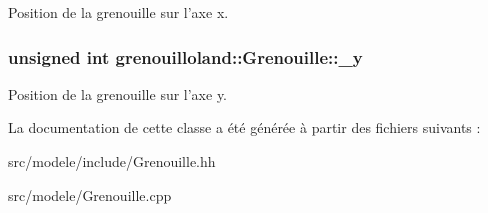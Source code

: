 Position de la grenouille sur l'axe x. \hypertarget{classgrenouilloland_1_1Grenouille_accbac66bf92efeca1135682eb24c99e7}{
\subsubsection[{\-\_\-y}]{\setlength{\rightskip}{0pt plus 5cm}unsigned int grenouilloland\-::\-Grenouille\-::\-\_\-y\hspace{0.3cm}{\ttfamily [protected]}}}\label{classgrenouilloland_1_1Grenouille_accbac66bf92efeca1135682eb24c99e7}
Position de la grenouille sur l'axe y. 

La documentation de cette classe a été générée à partir des fichiers suivants \-:\begin{DoxyCompactItemize}
\item 
src/modele/include/Grenouille.\-hh\item 
src/modele/Grenouille.\-cpp\end{DoxyCompactItemize}
